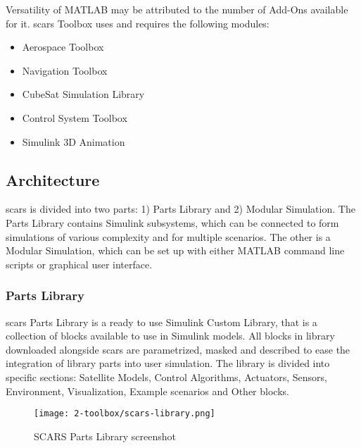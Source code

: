     Versatility of MATLAB may be attributed to the number of Add-Ons available for it. \ac{scars} Toolbox uses and requires the following modules:
    \begin{itemize}
        \item Aerospace Toolbox
        \item Navigation Toolbox
        \item CubeSat Simulation Library
        \item Control System Toolbox
        \item Simulink 3D Animation
    \end{itemize}
    

\subsection{Architecture}\label{toolbox:architecture}
    \ac{scars} is divided into two parts: 1) Parts Library and 2) Modular Simulation. The Parts Library contains Simulink subsystems, which can be connected to form simulations of various complexity and for multiple scenarios. The other is a Modular Simulation, which can be set up with either MATLAB command line scripts or graphical user interface.

    \subsubsection{Parts Library}
        \ac{scars} Parts Library is a ready to use Simulink Custom Library, that is a collection of blocks available to use in Simulink models. All blocks in library downloaded alongside \ac{scars} are parametrized, masked and described to ease the integration of library parts into user simulation. The library is divided into specific sections: Satellite Models, Control Algorithms, Actuators, Sensors, Environment, Visualization, Example scenarios and Other blocks.
% 
        \begin{figure}[H]
            \centering
            \texttt{[image: 2-toolbox/scars-library.png]}
            \caption{SCARS Parts Library screenshot}
            \label{fig:scars-library}
        \end{figure}

